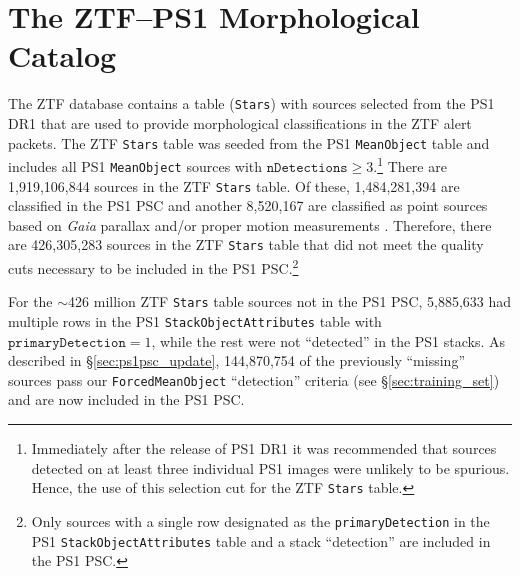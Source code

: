 \documentclass[twocolumn]{aastex63}
\begin{document}



\appendix

\section{The ZTF--PS1 Morphological Catalog}\label{app:cat_counts}

The ZTF database contains a table (\texttt{Stars}) with sources selected from
the PS1 DR1 that are used to provide morphological classifications in the ZTF
alert packets. The ZTF \texttt{Stars} table was seeded from the PS1
\texttt{MeanObject} table and includes all PS1 \texttt{MeanObject} sources
with $\mathtt{nDetections} \ge 3$.\footnote{Immediately after the release of
PS1 DR1 it was recommended that sources detected on at least three individual
PS1 images were unlikely to be spurious. Hence, the use of this selection cut
for the ZTF \texttt{Stars} table.} There are 1,919,106,844 sources in the ZTF
\texttt{Stars} table. Of these, 1,484,281,394 are classified in the PS1 PSC
and another 8,520,167 are classified as point sources based on \textit{Gaia}
parallax and/or proper motion measurements \citep{Tachibana18}. Therefore,
there are 426,305,283 sources in the ZTF \texttt{Stars} table that did not
meet the quality cuts necessary to be included in the PS1 PSC.\footnote{Only
sources with a single row designated as the \texttt{primaryDetection} in the
PS1 \texttt{StackObjectAttributes} table and a stack ``detection''
\citep[i.e., the PSF, Kron, and aperture flux are all $>0$ in at least one
filter, see][]{Tachibana18} are included in the PS1 PSC. }

For the $\sim$426 million ZTF \texttt{Stars} table sources not in the PS1 PSC,
5,885,633 had multiple rows in the PS1 \texttt{StackObjectAttributes} table
with $\mathtt{primaryDetection} = 1$, while the rest were not ``detected'' in
the PS1 stacks. As described in \S\ref{sec:ps1psc_update}, 144,870,754 of the
previously ``missing'' sources pass our \texttt{ForcedMeanObject}
``detection'' criteria (see \S\ref{sec:training_set}) and are now included in
the PS1 PSC.
\end{document}
